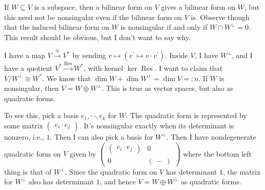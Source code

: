 \documentclass{amsart}
\theoremstyle{theorem}
\theoremstyle{definition}
\DeclareMathOperator{\Res}{Res}
\begin{document}
If $W\subseteq V$ is a subspace, then a bilinear form on $V$ gives a bilinear form on $W$, but this need not be nonsingular even if the bilinear form on $V$ is. Observe though that the induced bilinear form on $W$ is nonsingular if and only if $W\cap W^\perp=0$. This result should be obvious, but I don't want to say why.

I have a map $V\xrightarrow{\cong} V^\ast$ by sending $v\mapsto(v^\prime\mapsto v\cdot v^\prime)$. Inside $V$, I have $W^\perp$, and I have a quotient $V^\ast\xrightarrow{\Res} W^\ast$, with kernel $\ker\Res$. I want to claim that $V/W^\perp\cong W^\ast$. We know that $\dim W+\dim W^\perp=\dim V=:n$. If $W$ is nonsingular, then $V=W\oplus W^\perp$. This is true as vector spaces, but also as quadratic forms.

To see this, pick a basis $e_1,\cdots,e_k$ for $W$. The quadratic form is represented by some matrix $\begin{pmatrix} e_i\cdot e_j \end{pmatrix}$. It's nonsingular exactly when its determinant is nonzero, i.e., $1$. Then I can also pick a basis for $W^\perp$. Then I have nondegenerate quadratic form on $V$ given by $\begin{pmatrix}\begin{pmatrix} e_i\cdot e_j \end{pmatrix} & 0 \\ 0 & \begin{pmatrix} ... \end{pmatrix}\end{pmatrix}$ where the bottom left thing is that of $W^\perp$. Since the quadratic form on $V$ has determinant $1$, the matrix for $W^\perp$ also has determinant $1$, and hence $V=W\oplus W^\perp$ as quadratic forms.
\end{document}
